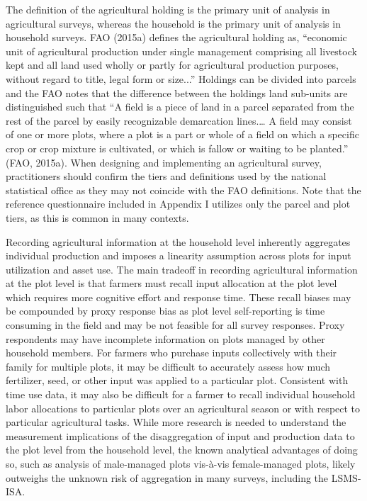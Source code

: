 \documentclass[
]{book}
\begin{document}
The definition of the agricultural holding is the primary unit of analysis in agricultural surveys, whereas the household is the primary unit of analysis in household surveys. FAO (2015a) defines the agricultural holding as, ``economic unit of agricultural production under single management comprising all livestock kept and all land used wholly or partly for agricultural production purposes, without regard to title, legal form or size...'' Holdings can be divided into parcels and the FAO notes that the difference between the holdings land sub-units are distinguished such that ``A field is a piece of land in a parcel separated from the rest of the parcel by easily recognizable demarcation lines.\ldots{} A field may consist of one or more plots, where a plot is a part or whole of a field on which a specific crop or crop mixture is cultivated, or which is fallow or waiting to be planted.'' (FAO, 2015a). When designing and implementing an agricultural survey, practitioners should confirm the tiers and definitions used by the national statistical office as they may not coincide with the FAO definitions. Note that the reference questionnaire included in Appendix I utilizes only the parcel and plot tiers, as this is common in many contexts.

Recording agricultural information at the household level inherently aggregates individual production and imposes a linearity assumption across plots for input utilization and asset use. The main tradeoff in recording agricultural information at the plot level is that farmers must recall input allocation at the plot level which requires more cognitive effort and response time. These recall biases may be compounded by proxy response bias as plot level self-reporting is time consuming in the field and may be not feasible for all survey responses. Proxy respondents may have incomplete information on plots managed by other household members. For farmers who purchase inputs collectively with their family for multiple plots, it may be difficult to accurately assess how much fertilizer, seed, or other input was applied to a particular plot. Consistent with time use data, it may also be difficult for a farmer to recall individual household labor allocations to particular plots over an agricultural season or with respect to particular agricultural tasks. While more research is needed to understand the measurement implications of the disaggregation of input and production data to the plot level from the household level, the known analytical advantages of doing so, such as analysis of male-managed plots vis-à-vis female-managed plots, likely outweighs the unknown risk of aggregation in many surveys, including the LSMS-ISA.
\end{document}
